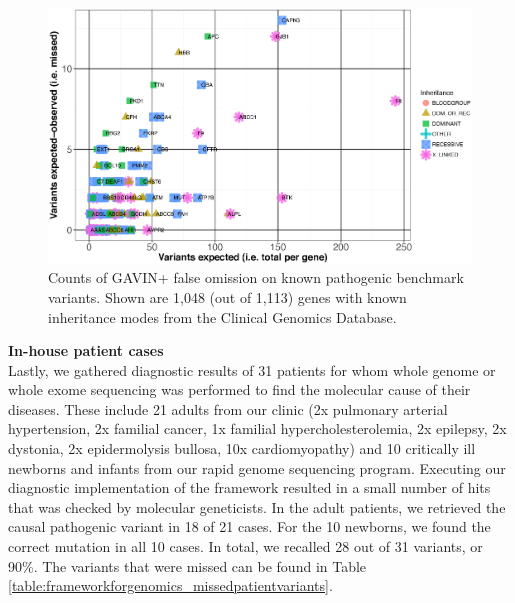 \begin{figure}
\centering
\includegraphics[width=1.0\linewidth]{img/frameworkforgenomics_for}
\caption[GAVIN+ false omission on pathogenic variants]{Counts of GAVIN+ false omission on known pathogenic benchmark variants. Shown are 1,048 (out of 1,113) genes with known inheritance modes from the Clinical Genomics Database.}
\label{fig:frameworkforgenomics_for}
\end{figure}

\noindent\textbf{In-house patient cases}\\
Lastly, we gathered diagnostic results of 31 patients for whom whole genome or whole exome sequencing was performed to find the molecular cause of their diseases.
These include 21 adults from our clinic (2x pulmonary arterial hypertension, 2x familial cancer, 1x familial hypercholesterolemia, 2x epilepsy, 2x dystonia, 2x epidermolysis bullosa, 10x cardiomyopathy) and 10 critically ill newborns and infants from our rapid genome sequencing program\cite{van_Diemen_2017}.
Executing our diagnostic implementation of the framework resulted in a small number of hits that was checked by molecular geneticists.
In the adult patients, we retrieved the causal pathogenic variant in 18 of 21 cases.
For the 10 newborns, we found the correct mutation in all 10 cases.
In total, we recalled 28 out of 31 variants, or 90\%.
The variants that were missed can be found in Table \ref{table:frameworkforgenomics_missedpatientvariants}.

